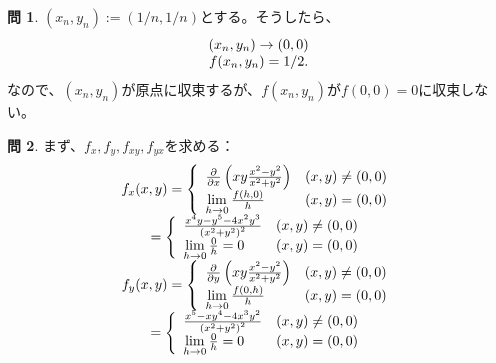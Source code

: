 \documentclass[12pt]{article} %
\theoremstyle{definition}
\newtheorem{question}{問}
\begin{document}
\begin{question}
	$(x_n,y_n):=\left( 1/n,1/n \right)$とする。そうしたら、\begin{equation*}
		\begin{array}[]{c}
			(x_n,y_n)\to(0,0)\\
			f(x_n,y_n)
			=1/2.
		\end{array}
	\end{equation*}
		なので、$(x_n,y_n)$が原点に収束するが、$f(x_n,y_n)$が$f(0,0)=0$に収束しない。
\end{question}
\begin{question}
	まず、$f_x,f_y,f_{xy},f_{yx}$を求める：
	\begin{equation*}
		\begin{array}[]{c}
			f_x(x,y)=\left\{\begin{array}[]{ll}
				\frac{\partial}{\partial x}\left( xy\frac{x^2-y^2}{x^2+y^2} \right)&(x,y)\neq(0,0)\\
				\lim_{h\to0}\frac{f(h,0)}{h}&(x,y)=(0,0)
			\end{array}\right.\\
			=\left\{\begin{array}[]{ll}
				\frac{x^4y-y^5-4x^2y^3}{\left( x^2+y^2 \right)^2}&(x,y)\neq(0,0)\\
				\lim_{h\to0}\frac{0}{h}=0&(x,y)=(0,0)
			\end{array}\right.\\
			f_y(x,y)=\left\{\begin{array}[]{ll}
				\frac{\partial}{\partial y}\left( xy\frac{x^2-y^2}{x^2+y^2} \right)&(x,y)\neq(0,0)\\
				\lim_{h\to0}\frac{f(0,h)}{h}&(x,y)=(0,0)
			\end{array}\right.\\
			=\left\{\begin{array}[]{ll}
				\frac{x^5-xy^4-4x^3y^2}{\left( x^2+y^2 \right)^2}&(x,y)\neq(0,0)\\
				\lim_{h\to0}\frac{0}{h}=0&(x,y)=(0,0)
			\end{array}\right.\\
		\end{array}
	\end{equation*}
\end{question}
\end{document}
